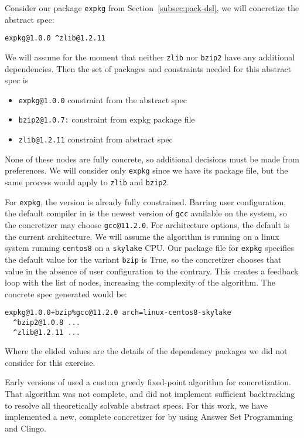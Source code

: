 Consider our package \texttt{expkg} from Section~\ref{subsec:pack-dsl}, we will concretize the abstract spec:
\begin{verbatim}
expkg@1.0.0 ^zlib@1.2.11
\end{verbatim}
We will assume for the moment that neither \texttt{zlib} nor \texttt{bzip2} have any additional dependencies. Then the set of packages and constraints needed for this abstract spec is

\begin{itemize}
\item \texttt{expkg@1.0.0} constraint from the abstract spec \\
\item \texttt{bzip2@1.0.7:} constraint from expkg package file \\
\item \texttt{zlib@1.2.11} constraint from abstract spec \\
\end{itemize}

None of these nodes are fully concrete, so additional decisions must be made from preferences.
We will consider only \texttt{expkg} since we have its package file, but the same process would apply to \texttt{zlib} and \texttt{bzip2}.

For \texttt{expkg}, the version is already fully constrained.
Barring user configuration, the default compiler in \spack{} is the newest version of \texttt{gcc} available on the system, so the concretizer may choose \texttt{gcc@11.2.0}.
For architecture options, the default is the current architecture. We will assume the algorithm is running on a linux system running \texttt{centos8} on a \texttt{skylake} CPU.
Our package file for \texttt{expkg} specifies the default value for the variant \texttt{bzip} is True, so the concretizer chooses that value in the absence of user configuration to the contrary.
This creates a feedback loop with the list of nodes, increasing the complexity of the algorithm.
The concrete spec generated would be:

\begin{verbatim}
expkg@1.0.0+bzip%gcc@11.2.0 arch=linux-centos8-skylake
  ^bzip2@1.0.8 ...
  ^zlib@1.2.11 ...
\end{verbatim}

Where the elided values are the details of the dependency packages we did not consider for this exercise.

Early versions of \spack{} used a custom greedy fixed-point algorithm for concretization.
That algorithm was not complete, and did not implement sufficient backtracking to resolve all theoretically solvable abstract specs.
For this work, we have implemented a new, complete concretizer for \spack{} by using Answer Set Programming and Clingo.
